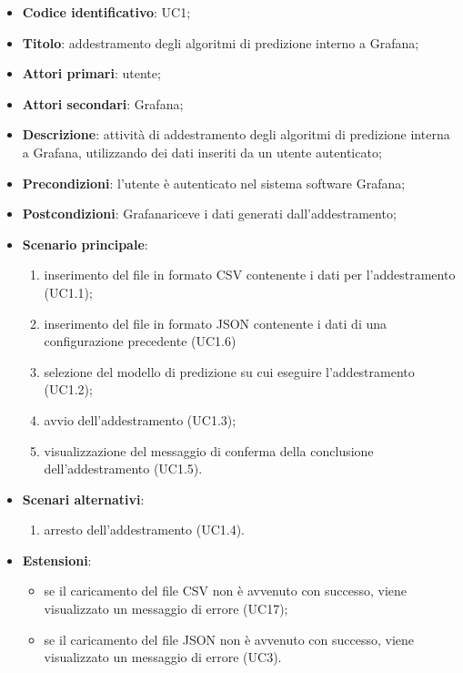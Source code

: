\begin{itemize}
	\item \textbf{Codice identificativo}: UC1;
	\item \textbf{Titolo}: addestramento degli algoritmi di predizione interno a Grafana\glo;
	\item \textbf{Attori primari}: utente;
	\item \textbf{Attori secondari}: Grafana\glo;
	\item \textbf{Descrizione}: attività di addestramento degli algoritmi di predizione interna a Grafana\glo, utilizzando dei dati inseriti da un utente autenticato;
	\item \textbf{Precondizioni}: l'utente è autenticato nel sistema software Grafana\glo;
	\item \textbf{Postcondizioni}: Grafana\glosp riceve i dati generati dall'addestramento;
	\item \textbf{Scenario principale}: 
		\begin{enumerate}
			\item inserimento del file in formato CSV contenente i dati per l'addestramento (UC1.1);
			\item inserimento del file in formato JSON contenente i dati di una configurazione precedente (UC1.6)
			\item selezione del modello di predizione su cui eseguire l'addestramento (UC1.2);
			\item avvio dell'addestramento (UC1.3);
			\item visualizzazione del messaggio di conferma della conclusione dell'addestramento (UC1.5).
		\end{enumerate}
	\item \textbf{Scenari alternativi}:
		\begin{enumerate}
			\item arresto dell'addestramento (UC1.4).
		\end{enumerate}
	\item \textbf{Estensioni}:
	\begin{itemize}
		\item se il caricamento del file CSV non è avvenuto con successo, viene visualizzato un messaggio di errore (UC17);
		\item se il caricamento del file JSON non è avvenuto con successo, viene visualizzato un messaggio di errore (UC3).
	\end{itemize}
\end{itemize}

